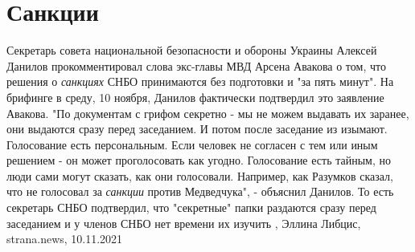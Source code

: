  
 
 
 
 
\chapter{Санкции}

Секретарь совета национальной безопасности и обороны Украины Алексей Данилов
прокомментировал слова экс-главы МВД Арсена Авакова о том, что решения о
\emph{санкциях} СНБО принимаются без подготовки и "за пять минут".  На брифинге в
среду, 10 ноября, Данилов фактически подтвердил это заявление Авакова.  "По
документам с грифом секретно - мы не можем выдавать их заранее, они выдаются
сразу перед заседанием. И потом после заседание из изымают.  Голосование есть
персональным. Если человек не согласен с тем или иным решением - он может
проголосовать как угодно. Голосование есть тайным, но люди сами могут сказать,
как они голосовали. Например, как Разумков сказал, что не голосовал за \emph{санкции}
против Медведчука", - объяснил Данилов.  То есть секретарь СНБО подтвердил, что
"секретные" папки раздаются сразу перед заседанием и у членов СНБО нет времени
их изучить
, 
Эллина Либцис, strana.news, 10.11.2021
